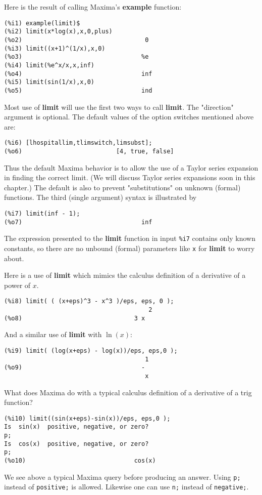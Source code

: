 \documentclass[12pt]{article}
\begin{document}
\normalsize
Here is the result of calling Maxima's \textbf{example} function:
\small
\begin{verbatim}
(%i1) example(limit)$
(%i2) limit(x*log(x),x,0,plus)
(%o2)                                  0
(%i3) limit((x+1)^(1/x),x,0)
(%o3)                                 %e
(%i4) limit(%e^x/x,x,inf)
(%o4)                                 inf
(%i5) limit(sin(1/x),x,0)
(%o5)                                 ind
\end{verbatim}
\normalsize
Most use of \textbf{limit} will use the first two ways to call \textbf{limit}.
The "direction" argument is optional.
The default values of the option switches mentioned above are:
\small
\begin{verbatim}
(%i6) [lhospitallim,tlimswitch,limsubst];
(%o6)                          [4, true, false]
\end{verbatim}
\normalsize
Thus the default Maxima behavior is to allow the use of a Taylor series expansion
  in finding the correct limit.
(We will discuss Taylor series expansions soon in this chapter.)
The default is also to prevent "substitutions" on unknown (formal) functions.
The third (single argument) syntax is illustrated by
\small
\begin{verbatim}
(%i7) limit(inf - 1);
(%o7)                                 inf
\end{verbatim}
\normalsize
The expression presented to the \textbf{limit} function in input \verb|%i7| contains only known
  constants, so there are no unbound (formal) parameters like \verb|x| for
  \textbf{limit} to worry about.

  \smallskip
Here is a use of \textbf{limit} which mimics the calculus definition of
  a derivative of a power of $x$.
\small
\begin{verbatim}
(%i8) limit( ( (x+eps)^3 - x^3 )/eps, eps, 0 );
                                        2
(%o8)                               3 x
\end{verbatim}
\normalsize

And a similar use of \textbf{limit} with $\ln(x)$:
\small
\begin{verbatim}
(%i9) limit( (log(x+eps) - log(x))/eps, eps,0 );
                                       1
(%o9)                                 -
                                       x
\end{verbatim}
\normalsize
What does Maxima do with a typical calculus definition of a derivative of a
  trig function?
\small
\begin{verbatim}
(%i10) limit((sin(x+eps)-sin(x))/eps, eps,0 );
Is  sin(x)  positive, negative, or zero?
p;
Is  cos(x)  positive, negative, or zero?
p;
(%o10)                              cos(x)
\end{verbatim}
\normalsize
We see above a typical Maxima query before producing an answer.
Using \verb|p;| instead of \verb|positive;| is allowed.  
Likewise one can use \verb|n;| instead of \verb|negative;|.
\end{document}
